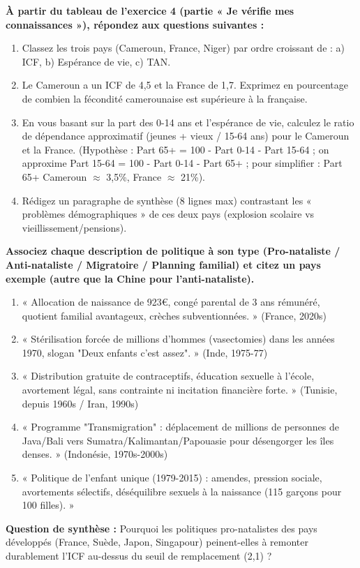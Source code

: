 \documentclass[11pt]{article}
\begin{document}
\begin{exercice}
\textbf{À partir du tableau de l'exercice 4 (partie « Je vérifie mes connaissances »), répondez aux questions suivantes :}
\begin{enumerate}
    \item Classez les trois pays (Cameroun, France, Niger) par ordre croissant de : a) ICF, b) Espérance de vie, c) TAN.
    \item Le Cameroun a un ICF de 4,5 et la France de 1,7. Exprimez en pourcentage de combien la fécondité camerounaise est supérieure à la française.
    \item En vous basant sur la part des 0-14 ans et l'espérance de vie, calculez le ratio de dépendance approximatif (jeunes + vieux / 15-64 ans) pour le Cameroun et la France. (Hypothèse : Part 65+ = 100 - Part 0-14 - Part 15-64 ; on approxime Part 15-64 = 100 - Part 0-14 - Part 65+ ; pour simplifier : Part 65+ Cameroun $\approx$ 3,5\%, France $\approx$ 21\%).
    \item Rédigez un paragraphe de synthèse (8 lignes max) contrastant les « problèmes démographiques » de ces deux pays (explosion scolaire vs vieillissement/pensions).
\end{enumerate}
\end{exercice}

\begin{exercice}
\textbf{Associez chaque description de politique à son type (Pro-nataliste / Anti-nataliste / Migratoire / Planning familial) et citez un pays exemple (autre que la Chine pour l'anti-nataliste).}
\begin{enumerate}
    \item « Allocation de naissance de 923€, congé parental de 3 ans rémunéré, quotient familial avantageux, crèches subventionnées. » (France, 2020s)
    \item « Stérilisation forcée de millions d'hommes (vasectomies) dans les années 1970, slogan "Deux enfants c'est assez". » (Inde, 1975-77)
    \item « Distribution gratuite de contraceptifs, éducation sexuelle à l'école, avortement légal, sans contrainte ni incitation financière forte. » (Tunisie, depuis 1960s / Iran, 1990s)
    \item « Programme "Transmigration" : déplacement de millions de personnes de Java/Bali vers Sumatra/Kalimantan/Papouasie pour désengorger les îles denses. » (Indonésie, 1970s-2000s)
    \item « Politique de l'enfant unique (1979-2015) : amendes, pression sociale, avortements sélectifs, déséquilibre sexuels à la naissance (115 garçons pour 100 filles). »
\end{enumerate}
\textbf{Question de synthèse :} Pourquoi les politiques pro-natalistes des pays développés (France, Suède, Japon, Singapour) peinent-elles à remonter durablement l'ICF au-dessus du seuil de remplacement (2,1) ?
\end{exercice}
\end{document}
